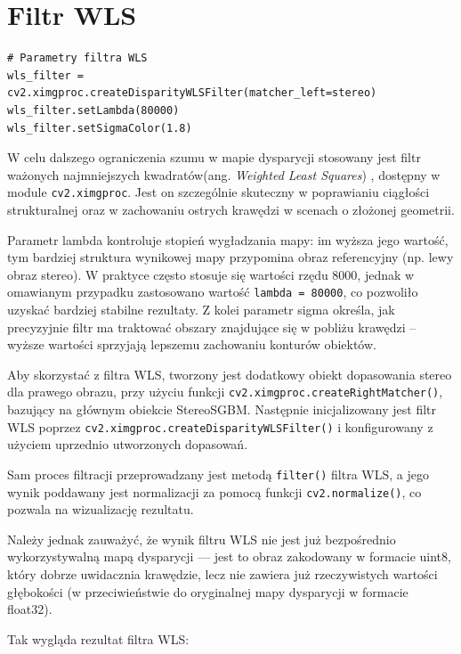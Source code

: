 \documentclass[magisterska]{pracadypl}
\begin{document}
\section{Filtr WLS}

\begin{lstlisting}[style=mypython]
# Parametry filtra WLS
wls_filter = cv2.ximgproc.createDisparityWLSFilter(matcher_left=stereo)
wls_filter.setLambda(80000)
wls_filter.setSigmaColor(1.8)
\end{lstlisting}

W celu dalszego ograniczenia szumu w mapie dysparycji stosowany jest filtr ważonych najmniejszych kwadratów(ang. \textit{Weighted Least Squares}) \cite{wls}, dostępny w module \texttt{cv2.ximgproc}. Jest on szczególnie skuteczny w poprawianiu ciągłości strukturalnej oraz w zachowaniu ostrych krawędzi w scenach o złożonej geometrii.

Parametr lambda kontroluje stopień wygładzania mapy: im wyższa jego wartość, tym bardziej struktura wynikowej mapy przypomina obraz referencyjny (np. lewy obraz stereo). W praktyce często stosuje się wartości rzędu 8000, jednak w omawianym przypadku zastosowano wartość \texttt{lambda = 80000}, co pozwoliło uzyskać bardziej stabilne rezultaty. Z kolei parametr sigma określa, jak precyzyjnie filtr ma traktować obszary znajdujące się w pobliżu krawędzi – wyższe wartości sprzyjają lepszemu zachowaniu konturów obiektów.

Aby skorzystać z filtra WLS, tworzony jest dodatkowy obiekt dopasowania stereo dla prawego obrazu, przy użyciu funkcji \texttt{cv2.ximgproc.createRightMatcher()}, bazujący na głównym obiekcie StereoSGBM. Następnie inicjalizowany jest filtr WLS poprzez \texttt{cv2.ximgproc.\allowbreak createDisparityWLSFilter()} i konfigurowany z użyciem uprzednio utworzonych dopasowań.

Sam proces filtracji przeprowadzany jest metodą \texttt{filter()} filtra WLS, a jego wynik poddawany jest normalizacji za pomocą funkcji \texttt{cv2.normalize()}, co pozwala na wizualizację rezultatu.

Należy jednak zauważyć, że wynik filtru WLS nie jest już bezpośrednio wykorzystywalną mapą dysparycji — jest to obraz zakodowany w formacie uint8, który dobrze uwidacznia krawędzie, lecz nie zawiera już rzeczywistych wartości głębokości (w przeciwieństwie do oryginalnej mapy dysparycji w formacie float32).

Tak wygląda rezultat filtra WLS:
\end{document}
